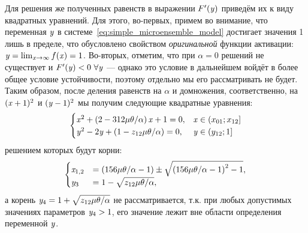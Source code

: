 Для решения же полученных равенств в выражении $F^{\prime}(\mathit{y})$ приведём их к виду квадратных уравнений. Для этого, во-первых, примем во внимание, что переменная $\mathit{y}$ в системе~\eqref{eq:simple_microensemble_model} достигает значения 1 лишь в пределе, что обусловлено свойством \textit{оригинальной} функции активации: $\mathit{y} = \lim_{\mathit{x} \to \infty} f(\mathit{x}) = 1$. Во-вторых, отметим, что при $\alpha = 0$ решений не существует и $F^{\prime}(\mathit{y}) < 0\ \forall \mathit{y}$ --- однако это условие в дальнейшем войдёт в более общее условие устойчивости, поэтому отдельно мы его рассматривать не будет. Таким образом, после деления равенств на $\alpha$ и домножения, соответственно, на $(\mathit{x} + 1)^{2}$ и $(\mathit{y} - 1)^{2}$ мы получим следующие квадратные уравнения:
\begin{equation}
    \nonumber
    \begin{cases}
        \mathit{x}^{2} + \left( 2 - 312 \mu \theta / \alpha \right) \mathit{x} + 1 = 0,     & \mathit{x} \in \left(x_{01}; x_{12}\right]    \\
        \mathit{y}^{2} - 2 \mathit{y} + \left( 1 - z_{12} \mu \theta / \alpha \right) = 0,  & \mathit{y} \in \left(y_{12}; 1\right]         \\
    \end{cases}
\end{equation}
решением которых будут корни:
\begin{equation}
    \nonumber
    \begin{cases}
        \mathit{x}_{1,2}    &= \left( 156 \mu \theta / \alpha - 1\right) \pm \sqrt{\left( 156 \mu \theta / \alpha - 1\right)^{2} - 1},      \\
        \mathit{y}_{3}      &= 1 - \sqrt{z_{12} \mu \theta / \alpha},                                                                       \\
    \end{cases}
\end{equation}
а корень $\mathit{y}_{4} = 1 + \sqrt{z_{12} \mu \theta / \alpha}$ не рассматривается, т.к. при любых допустимых значениях параметров $\mathit{y}_{4} > 1$, \ie его значение лежит вне области определения переменной $\mathit{y}$.

